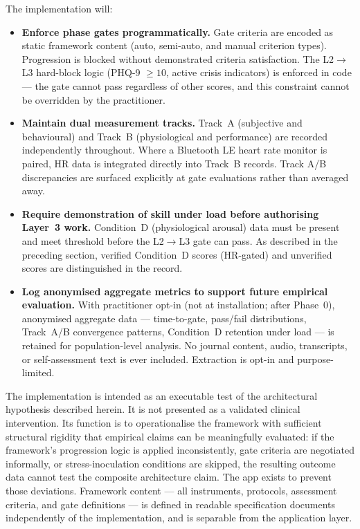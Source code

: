 \documentclass[12pt, a4paper]{article}
\begin{document}
The implementation will:

\begin{itemize}[leftmargin=2em]
\item \textbf{Enforce phase gates programmatically.} Gate criteria are encoded
as static framework content (auto, semi-auto, and manual criterion types).
Progression is blocked without demonstrated criteria satisfaction. The
L2$\to$L3 hard-block logic (PHQ-9 $\geq10$, active crisis indicators) is
enforced in code --- the gate cannot pass regardless of other scores, and this
constraint cannot be overridden by the practitioner.

\item \textbf{Maintain dual measurement tracks.} Track~A (subjective and
behavioural) and Track~B (physiological and performance) are recorded
independently throughout. Where a Bluetooth LE heart rate monitor is paired,
HR data is integrated directly into Track~B records. Track A/B discrepancies
are surfaced explicitly at gate evaluations rather than averaged away.

\item \textbf{Require demonstration of skill under load before authorising
Layer~3 work.} Condition~D (physiological arousal) data must be present and
meet threshold before the L2$\to$L3 gate can pass. As described in the
preceding section, verified Condition~D scores (HR-gated) and unverified scores
are distinguished in the record.

\item \textbf{Log anonymised aggregate metrics to support future empirical
evaluation.} With practitioner opt-in (not at installation; after Phase~0),
anonymised aggregate data --- time-to-gate, pass/fail distributions, Track~A/B
convergence patterns, Condition~D retention under load --- is retained for
population-level analysis. No journal content, audio, transcripts, or
self-assessment text is ever included. Extraction is opt-in and purpose-limited.
\end{itemize}

The implementation is intended as an executable test of the architectural
hypothesis described herein. It is not presented as a validated clinical
intervention. Its function is to operationalise the framework with sufficient
structural rigidity that empirical claims can be meaningfully evaluated: if the
framework's progression logic is applied inconsistently, gate criteria are
negotiated informally, or stress-inoculation conditions are skipped, the
resulting outcome data cannot test the composite architecture claim. The app
exists to prevent those deviations. Framework content --- all instruments,
protocols, assessment criteria, and gate definitions --- is defined in
readable specification documents independently of the implementation, and is
separable from the application layer.
\end{document}
